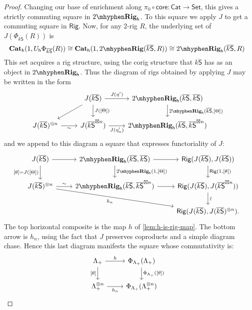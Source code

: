 \documentclass[12pt,reqno]{amsart}
\theoremstyle{plain}
\theoremstyle{definition}
\theoremstyle{remark}
\newcommand{\maps}{\colon}
\newcommand{\category}[1]{\mathsf{#1}}
\renewcommand{\S}{\category S}
\newcommand{\namedcat}[1]{\mathsf{#1}}
\newcommand{\Cat}{\namedcat{Cat}}
\newcommand{\Rig}{\namedcat{Rig}}
\newcommand{\Set}{\namedcat{Set}}
\newcommand{\TRig}{2\mhyphen\namedbicat{Rig}}
\newcommand{\namedbicat}[1]{\mathbf{#1}}
\newcommand{\CCat}{\namedbicat{Cat}}
\newcommand{\ho}{_\mathsf{h}}
\newcommand{\ksbar}{\overline{k\S}}
\numberwithin{thm}{section}
\begin{document}
\begin{proof}
    Changing our base of enrichment along $\pi_0 \circ \mathsf{core} \maps \Cat \to \Set$, this gives a strictly commuting square in $\TRig\ho$. To this square we apply $J$ to get a commuting square in $\Rig$. Now, for any 2-rig $R$, the underlying set of $J(\Phi_{\ksbar}(R))$ is 
    \[
    \CCat\ho(1, U\ho\Phi_{\ksbar}(R)) \cong \CCat\ho(1, \TRig(\ksbar, R)) \cong  \TRig\ho(\ksbar, R)
    \]
    This set acquires a rig structure, using the corig structure that $\ksbar$ has as an object in $\TRig\ho$. Thus the diagram of rigs obtained by applying $J$ may be written in the form 
    \[
    \begin{tikzcd}
        & 
        J(\ksbar) 
        \arrow[r, "J(\eta')"] 
        \arrow[dl] 
        \arrow[d, "J(\lbrack\Theta \rbrack)"] 
        & 
        \TRig\ho(\ksbar, \ksbar) 
        \arrow[d, "{\TRig\ho(\ksbar, \lbrack \Theta\rbrack)}"] 
        \\ 
        J(\ksbar)^{\otimes n} 
        \arrow[r, "\sim", swap] 
        & 
        J(\ksbar^{\boxtimes n}) 
        \arrow[r, "J(\eta_n')", swap] 
        & 
        \TRig\ho(\ksbar, \ksbar^{\boxtimes n})
    \end{tikzcd}
    \]
    and we append to this diagram a square that expresses functoriality of $J$: 
    \[
    \begin{tikzcd}
        J(\ksbar)
        \arrow[r]
        \arrow[swap, d, "\lbrack \theta \rbrack = J(\lbrack\Theta\rbrack)"]
        &
        \TRig\ho(\ksbar, \ksbar)
        \arrow[d, "{\TRig\ho(1, \lbrack\Theta\rbrack)}"]
        \arrow[r]
        &
        \Rig(J(\ksbar), J(\ksbar))
        \arrow[d, "{\Rig(1, \lbrack\theta \rbrack)}"]
        \\ 
        J(\ksbar)^{\otimes n} 
        \arrow[swap, drr, "h_n"] 
        \arrow[r, "\sim"] 
        & 
        \TRig\ho(\ksbar, \ksbar^{\boxtimes n}) 
        \arrow[r] 
        & 
        \Rig(J(\ksbar), J(\ksbar^{\boxtimes n})) 
        \arrow[d, "\sim", sloped] 
        \\&& 
        \Rig(J(\ksbar), J(\ksbar)^{\otimes n}).
    \end{tikzcd}
    \]
    The top horizontal composite is the map $h$ of \cref{lem:h-is-rig-map}. The bottom arrow is $h_n$, using the fact that $J$ preserves coproducts and a simple diagram chase. Hence this last diagram manifests the square whose commutativity is:
    \[
    \begin{tikzcd}
        \Lambda_+ 
        \arrow[r, "h"] 
        \arrow[swap, d, "\lbrack\theta \rbrack"] 
        & 
        \Phi_{\Lambda_+}(\Lambda_+) 
        \arrow[d, "\Phi_{\Lambda_+}(\lbrack\theta \rbrack)"] 
        \\
        \Lambda_+^{\otimes n} 
        \arrow[r, "h_n", swap] 
        & 
        \Phi_{\Lambda_+}(\Lambda_+^{\otimes n}) 
    \end{tikzcd}  \qedhere
    \]
\end{proof}
\end{document}
